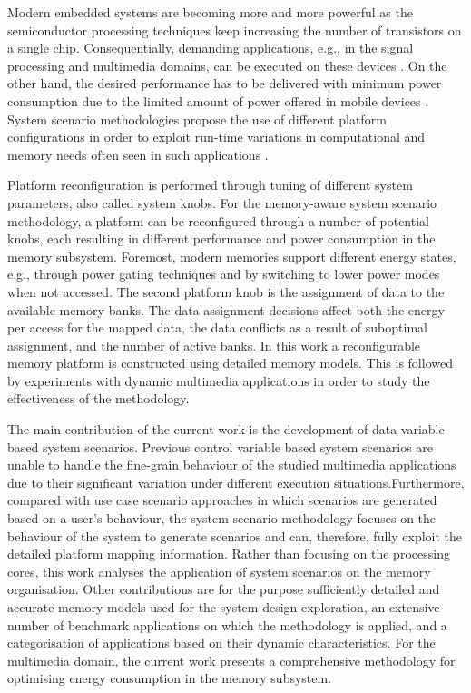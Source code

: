 \documentclass[a4paper,conference]{IEEEtran}
\begin{document}
Modern embedded systems are becoming more and more powerful as the semiconductor processing techniques keep increasing the number of transistors on a single chip. Consequentially, demanding applications, e.g., in the signal processing and multimedia domains, can be executed on these devices \cite{narasinga}. On the other hand, the desired performance has to be delivered with minimum power consumption due to the limited amount of power offered in mobile devices \cite{tcm}. System scenario methodologies propose the use of different platform configurations in order to exploit run-time variations in computational and memory needs often seen in such applications \cite{tcm}.

Platform reconfiguration is performed through tuning of different system parameters, also called system knobs. For the memory-aware system scenario methodology, a platform can be reconfigured through a number of potential knobs, each resulting in different performance and power consumption in the memory subsystem. Foremost, modern memories support different energy states, e.g., through power gating techniques and by switching to lower power modes when not accessed. %
The second platform knob is the assignment of data to the available memory banks. The data assignment decisions affect both the energy per access for the mapped data, the data conflicts as a result of suboptimal assignment, and the number of active banks. In this work a reconfigurable memory platform is constructed using detailed memory models. This is followed by experiments with dynamic multimedia applications in order to study the effectiveness of the methodology.

The main contribution of the current work is the development of data variable based system scenarios. Previous control variable based system scenarios are unable to handle the fine-grain behaviour of the studied multimedia applications due to their significant variation under different execution situations.Furthermore, compared with use case scenario approaches in which scenarios are generated based on a user's behaviour, the system scenario methodology focuses on the behaviour of the system to generate scenarios and can, therefore, fully exploit the detailed platform mapping information. Rather than focusing on the processing cores, this work analyses the application of system scenarios on the memory organisation. Other contributions are for the purpose sufficiently detailed and accurate memory models used for the system design exploration, an extensive number of benchmark applications on which the methodology is applied, and a categorisation of applications based on their dynamic characteristics. For the multimedia domain, the current work presents a comprehensive methodology for optimising energy consumption in the memory subsystem.
\end{document}
